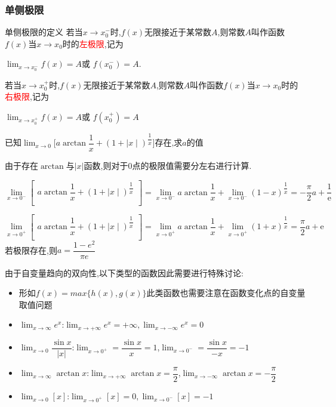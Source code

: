 \documentclass[9pt a4paper, oneside, UTF8]{ctexbook}
\begin{document}
\begin{sloppypar}
    \subsubsection{单侧极限}
    \begin{defn}{单侧极限的定义}{}
        若当$x\to x_0^{-}$时,$f(x)$无限接近于某常数$A$,则常数$A$叫作函数$f(x)$当$x\to x_0$时的\textcolor{red}{左极限},记为
        \begin{center}
            $\operatorname*{lim}_{x\to x_0^{-}}f(x)=A$或 $f(x_0^{-})=A$.
        \end{center}
        若当$x\to x_0^+$时,$f(x)$无限接近于某常数$A$,则常数$A$叫作函数$f(x)$当$x\to x_0$时的\textcolor{red}{右极限},记为
        \begin{center}
            $\operatorname*{lim}_{x\to x_0^{+}}f(x)=A$或 $f(x_0^{+})=A$
        \end{center}
    \end{defn}
    \begin{problem}
    $\text{已知}\lim_{x\to0}\biggl[a\arctan\dfrac{1}{x}+(1+\mid x\mid)^{\dfrac{1}{x}}\biggr]\text{存在,求}a\text{的值}$
    \end{problem}
    \begin{solution}
        由于存在$\arctan$与$|x|$函数,则对于0点的极限值需要分左右进行计算.

        $\lim\limits_{x\to0^{-}}\left[\begin{matrix}a\arctan\dfrac{1}{x}+(1+\mid x\mid)^{\dfrac{1}{x}}\\\end{matrix}\right]=\lim\limits_{x\to0^{-}}a\arctan\dfrac{1}{x}+\lim\limits_{x\to0^{-}}(1-x)^{\dfrac{1}{x}}=-\dfrac{\pi}{2}a+\dfrac{1}{\text{e}}$

        $\lim\limits_{x\to0^+}\left[\begin{matrix}a\arctan\dfrac{1}{x}+(1+\mid x\mid)^{\dfrac{1}{x}}\\\end{matrix}\right]=\lim\limits_{x\to0^+}a\arctan\dfrac{1}{x}+\lim\limits_{x\to0^+}(1+x)^{\dfrac{1}{x}}=\dfrac{\pi}{2}a+\mathrm{e}$
        若极限存在,则$a=\dfrac{1-e^2}{\pi e}$
    \end{solution}
    \begin{note}
        由于自变量趋向的双向性,以下类型的函数因此需要进行特殊讨论:
        \begin{itemize}
            \item 形如$f(x)=max\{h(x),g(x)\}$此类函数也需要注意在函数变化点的自变量取值问题
            \item $\lim_{x \to \infty}e^x$:$\lim _{x \to +\infty}e^x=+\infty,
                      \lim _{x \to -\infty}e^x=0$
            \item $\lim_{x \to 0} \dfrac{\sin x}{|x|}$:$\lim_{x \to 0^+}=\dfrac{\sin x}{x}=1$,$\lim_{x \to 0^-}=\dfrac{\sin x}{-x}=-1$
            \item $\lim_{x \to \infty }\arctan x$:$\lim_{x \to +\infty}\arctan x=\dfrac{\pi}{2}$,$\lim_{x \to -\infty}\arctan x= -\dfrac{\pi}{2}$
            \item $\lim_{x \to 0}[x]$:$\lim _{x \to 0^+}[x]=0,\lim_{x \to 0^-}[x]=-1$
        \end{itemize}
    \end{note}

\end{sloppypar}
\end{document}

